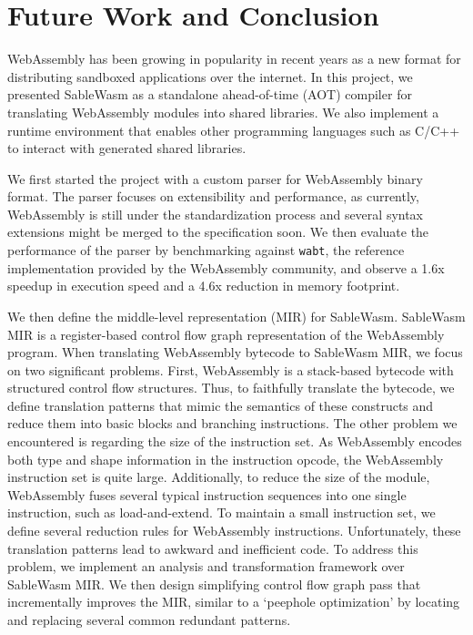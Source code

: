 \chapter{Future Work and Conclusion}
\label{chapter:conclusion}

WebAssembly has been growing in popularity in recent years as a new format
for distributing sandboxed applications over the internet. In this project, we
presented SableWasm as a standalone ahead-of-time (AOT) compiler for
translating WebAssembly modules into shared libraries. We also implement a
runtime environment that enables other programming languages such as C/C++ to
interact with generated shared libraries.

We first started the project with a custom parser for WebAssembly binary format.
The parser focuses on extensibility and performance, as currently, WebAssembly
is still under the standardization process and several syntax extensions might
be merged to the specification soon. We then evaluate the performance of the
parser by benchmarking against \texttt{wabt}, the reference implementation
provided by the WebAssembly community, and observe a 1.6x speedup in execution
speed and a 4.6x reduction in memory footprint.

We then define the middle-level representation (MIR) for SableWasm. SableWasm
MIR is a register-based control flow graph representation of the WebAssembly
program. When translating WebAssembly bytecode to SableWasm MIR, we focus on
two significant problems. First, WebAssembly is a stack-based bytecode with
structured control flow structures. Thus, to faithfully translate the bytecode,
we define translation patterns that mimic the semantics of these constructs and
reduce them into basic blocks and branching instructions. The other problem we
encountered is regarding the size of the instruction set. As WebAssembly encodes
both type and shape information in the instruction opcode, the WebAssembly
instruction set is quite large. Additionally, to reduce the size of the module,
WebAssembly fuses several typical instruction sequences into one single
instruction, such as load-and-extend. To maintain a small instruction set, we
define several reduction rules for WebAssembly instructions. Unfortunately,
these translation patterns lead to awkward and inefficient code. To address
this problem, we implement an analysis and transformation framework over
SableWasm MIR. We then design simplifying control flow graph pass that
incrementally improves the MIR, similar to a `peephole optimization' by
locating and replacing several common redundant patterns.


